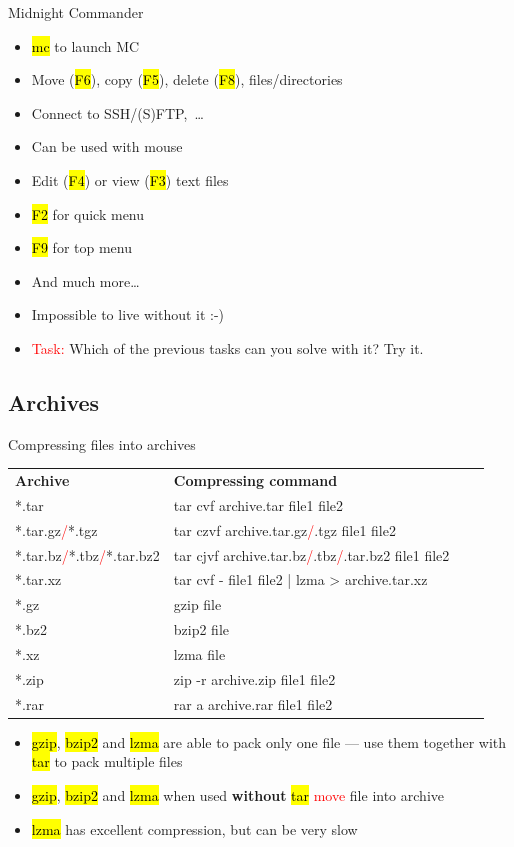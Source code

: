 \documentclass[compress, ucs, xelatex, 11pt, xcolor=svgnames, aspectratio=169,
	hyperref={
		bookmarks=true,
		unicode=true,
		colorlinks=true,
		pdftitle={Linux, command line and MetaCentrum},
		plainpages=false,
		pdfauthor={Vojtech Zeisek},
		pdfsubject={Course about use of Linux command line, writing shell scripts and using MetaCentrum of CESNET},
		pdfcreator={XeLaTeX},
		pdfkeywords={Linux, GNU, BASH, shell, command line, MetaCentrum},
		linkcolor=DarkRed, %
		anchorcolor=DarkBlue, %
		citecolor=Indigo, %
		filecolor=NavyBlue, %
		menucolor=DarkMagenta, %
		urlcolor=DarkBlue, %
		pdftex},
	url={hyphens, lowtilde} %
	]{beamer}
\renewcommand{\texttt}[1]{\hl{\ttfamily #1}}
\renewcommand{\alert}[1]{\textcolor{red}{#1}}
\begin{document}
\begin{frame}{Midnight Commander}
	\begin{multicols}{2}
		\begin{itemize}
			\item \texttt{mc} to launch MC
			\item Move (\texttt{F6}), copy (\texttt{F5}), delete (\texttt{F8}), files/directories
			\item Connect to SSH/(S)FTP,~\ldots
			\item Can be used with mouse
			\item Edit (\texttt{F4}) or view (\texttt{F3}) text files
			\item \texttt{F2} for quick menu
			\item \texttt{F9} for top menu
			\item And much more\ldots
			\item Impossible to live without it :-)
			\item \alert{Task:} Which of the previous tasks can you solve with it? Try it.
		\end{itemize}
		\texttt{[image: mc.png]}
	\end{multicols}
\end{frame}

\subsection{Archives}

\begin{frame}{Compressing files into archives}
	\begin{center}
		\begin{tabular}{llll}
			\textbf{Archive} & \textbf{Compressing command}\\
			*.tar & tar cvf archive.tar file1 file2\\
			*.tar.gz\alert{/}*.tgz & tar czvf archive.tar.gz\alert{/}.tgz file1 file2\\
			*.tar.bz\alert{/}*.tbz\alert{/}*.tar.bz2 & tar cjvf archive.tar.bz\alert{/}.tbz\alert{/}.tar.bz2 file1 file2\\
			*.tar.xz & tar cvf - file1 file2 | lzma > archive.tar.xz\\
			*.gz & gzip file\\
			*.bz2 & bzip2 file\\
			*.xz & lzma file\\
			*.zip & zip -r archive.zip file1 file2\\
			*.rar & rar a archive.rar file1 file2
		\end{tabular}
	\end{center}
	\begin{itemize}
		\item \texttt{gzip}, \texttt{bzip2} and \texttt{lzma} are able to pack only one file --- use them together with \texttt{tar} to pack multiple files
		\item \texttt{gzip}, \texttt{bzip2} and \texttt{lzma} when used \textbf{without} \texttt{tar} \alert{move} file into archive
		\item \texttt{lzma} has excellent compression, but can be very slow
	\end{itemize}
\end{frame}
\end{document}
